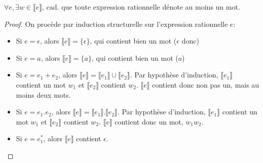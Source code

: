 \begin{theorem}
$\forall e, \exists w \in \llbracket e \rrbracket$, cad. que toute expression rationnelle dénote au moins un mot.
\end{theorem}
\begin{proof}
On procède par induction structurelle sur l'expression rationnelle $e$:

\begin{itemize}
\item Si $e = \epsilon$, alors $\llbracket e \rrbracket = \{\epsilon\}$, qui contient bien un mot ($\epsilon$ donc)
\item Si $e = a$, alors $\llbracket e \rrbracket = \{a\}$, qui contient bien un mot ($a$)
\item Si $e = e_1 + e_2$, alors $\llbracket e \rrbracket = \llbracket e_1 \rrbracket \cup \llbracket e_2 \rrbracket$. Par hypothèse d'induction, $\llbracket e_1 \rrbracket$ contient un mot $w_1$ et $\llbracket e_2 \rrbracket$ contient $w_2$. $\llbracket e \rrbracket$ contient donc non pas un, mais au moins deux mots.
\item Si $e = e_1.e_2$, alors $\llbracket e \rrbracket = \llbracket e_1 \rrbracket . \llbracket e_2 \rrbracket$. Par hypothèse d'induction, $\llbracket e_1 \rrbracket$ contient un mot $w_1$ et $\llbracket e_2 \rrbracket$ contient $w_2$. $\llbracket e \rrbracket$ contient donc un mot, $w_1w_2$.
\item Si $e = e_1^*$, alors $\llbracket e \rrbracket$ contient $\epsilon$.
\end{itemize}
\end{proof}

